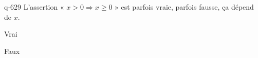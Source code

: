 \begin{truefalse}{q-629}
L'assertion « $x>0 \Rightarrow x \geq 0$ » est parfois vraie, parfois fausse, ça dépend de $x$.
\item Vrai
\item* Faux
\end{truefalse}

